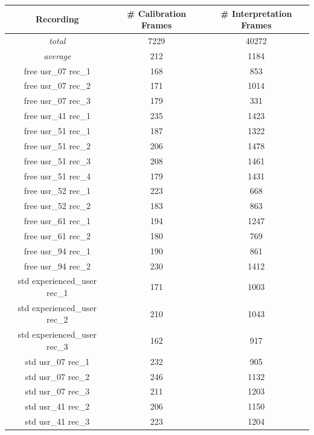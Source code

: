\begin{table}
    \begin{tabular}{|c|c|c|}
        \hline
        \textbf{Recording} & \textbf{\# Calibration Frames} & \textbf{\# Interpretation Frames} \\
        \hline
        \textit{total} & 7229 & 40272 \\
        \hline
        \textit{average} & 212 & 1184 \\
        \hline
        free usr\_07 rec\_1 & 168 & 853 \\
        \hline
        free usr\_07 rec\_2 & 171 & 1014 \\
        \hline
        free usr\_07 rec\_3 & 179 & 331 \\
        \hline
        free usr\_41 rec\_1 & 235 & 1423 \\
        \hline
        free usr\_51 rec\_1 & 187 & 1322 \\
        \hline
        free usr\_51 rec\_2 & 206 & 1478 \\
        \hline
        free usr\_51 rec\_3 & 208 & 1461 \\
        \hline
        free usr\_51 rec\_4 & 179 & 1431 \\
        \hline
        free usr\_52 rec\_1 & 223 & 668 \\
        \hline
        free usr\_52 rec\_2 & 183 & 863 \\
        \hline
        free usr\_61 rec\_1 & 194 & 1247 \\
        \hline
        free usr\_61 rec\_2 & 180 & 769 \\
        \hline
        free usr\_94 rec\_1 & 190 & 861 \\
        \hline
        free usr\_94 rec\_2 & 230 & 1412 \\
        \hline
        std experienced\_user rec\_1 & 171 & 1003 \\
        \hline
        std experienced\_user rec\_2 & 210 & 1043 \\
        \hline
        std experienced\_user rec\_3 & 162 & 917 \\
        \hline
        std usr\_07 rec\_1 & 232 & 905 \\
        \hline
        std usr\_07 rec\_2 & 246 & 1132 \\
        \hline
        std usr\_07 rec\_3 & 211 & 1203 \\
        \hline
        std usr\_41 rec\_2 & 206 & 1150 \\
        \hline
        std usr\_41 rec\_3 & 223 & 1204 \\

\end{tabular}
\end{table}
